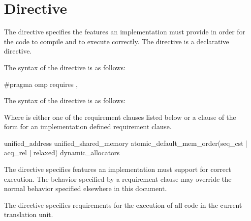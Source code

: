 \section{ Directive}
\label{sec:requires Directive}

\summary The  directive specifies the features an implementation
must provide in order for the code to compile and to execute correctly.
The  directive is a declarative directive.




\syntax
\begin{ccppspecific}
  The syntax of the  directive is as follows:

\begin{ompcPragma}
  #pragma omp requires \plc{clause[ [ [},\plc{] clause] ... ] new-line}

\end{ompcPragma}

\end{ccppspecific}

\begin{fortranspecific}
  The syntax of the  directive is as follows:


\end{fortranspecific}

Where  is either one of the requirement clauses listed below or a
clause of the form {} for an
implementation defined requirement clause.

\begin{indentedcodelist}
unified_address
unified_shared_memory
atomic_default_mem_order(seq_cst \textnormal{|} acq_rel \textnormal{|} relaxed)
dynamic_allocators
\end{indentedcodelist}

\descr

The  directive specifies features an implementation must
support for correct execution. The behavior specified by a requirement clause
may override the normal behavior specified elsewhere in this document.

\begin{ccppspecific}
The  directive specifies requirements for the execution of all
code in the current translation unit.
\end{ccppspecific}

